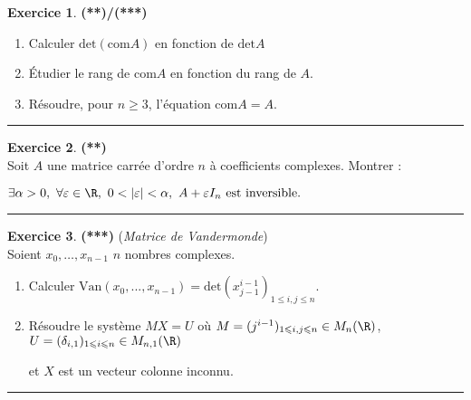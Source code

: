 \documentclass[a4paper,11pt]{article}
\theoremstyle{definition}
\newtheorem{exo}{Exercice} %
\begin{document}
\begin{minipage}{1\linewidth}\begin{minipage}[c]{0.48\linewidth}\raggedright

\begin{exo}\textbf{(**)/(***)}\quad\\[0.2cm]
	\begin{enumerate}
		\item Calculer $\mbox{det}(\mbox{com}A)$ en fonction de $\mbox{det}A$ 
		\item Étudier le rang de $\mbox{com}A$ en fonction du rang de $A$.
		\item Résoudre, pour $n\geq 3$, l'équation $\mbox{com}A=A$.
	\end{enumerate}
	
	
	\centering\rule{1\linewidth}{0.6pt}\end{exo}

	\begin{exo}\textbf{(**)}\quad\\[0.2cm]
	Soit $A$ une matrice carrée d'ordre $n$ à coefficients complexes. Montrer :
	
	$\exists \alpha>0,\ \forall\varepsilon\in\R,\ 0<|\varepsilon|<\alpha,\ A+\varepsilon I_n \textrm{ est inversible.}$
	
	\centering\rule{1\linewidth}{0.6pt}\end{exo}



\begin{exo}\textbf{(***)} (\textit{Matrice de \sc Vandermonde})\quad\\[0.2cm]
	Soient $x_0, \dots ,x_{n-1}$ $n$ nombres complexes.
	
	\begin{enumerate}
		\item Calculer $\text{Van}(x_0,...,x_{n-1})= \text{det}(x_{j-1}^{i-1})_{1\leqslant i,j\leqslant n}$.
		\item Résoudre le système $MX = U$ où $M =(j^{i-1})_{1\leqslant i,j\leqslant n}\in M_n(\R)$, $U=(\delta_{i,1})_{1\leqslant i\leqslant n}\in M_{n,1}(\R)$ 
		
		et $X$ est un vecteur colonne inconnu.
		
	\end{enumerate}
	
	\centering\rule{1\linewidth}{0.6pt}\end{exo}


	





\end{minipage}
\end{minipage}
\end{document}
